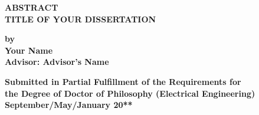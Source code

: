 \begin{center}
 {\large \bf ABSTRACT } \\ \vspace{0.2in}
 {\large \bf TITLE OF YOUR DISSERTATION} \\ \vspace{0.2in}

 {\large \bf by } \\ \vspace{0.3in}
 {\large \bf Your Name} \\ \vspace{0.3in}
 {\large \bf Advisor: Advisor's Name}  \\ \vspace{0.2in}

 {\bf Submitted in Partial Fulfillment of the Requirements for\\
 the Degree of Doctor of Philosophy (Electrical Engineering)
 } \\
 \vspace{0.2in}
 {\bf September/May/January 20**} \\
 \vspace{0.2in}

\end{center}

